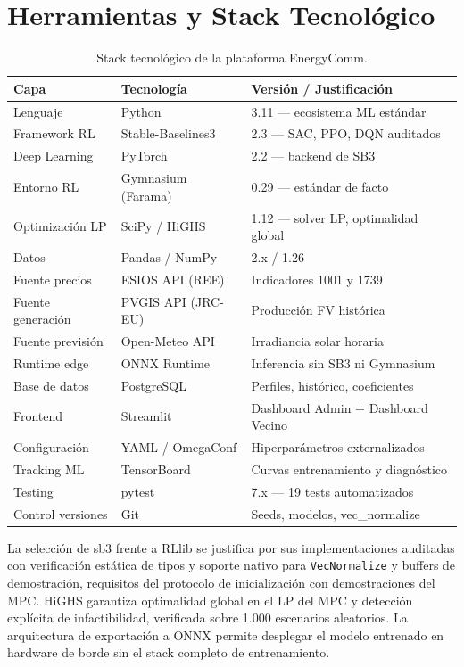 \documentclass[12pt, a4paper, twoside]{report}
\begin{document}
\section{Herramientas y Stack Tecnológico}
\label{sec:herramientas}

\begin{table}[H]
\centering
\caption{Stack tecnológico de la plataforma EnergyComm.}
\label{tab:stack}
\begin{tabularx}{\textwidth}{lll}
\toprule
\textbf{Capa} & \textbf{Tecnología} & \textbf{Versión / Justificación} \\
\midrule
Lenguaje & Python & 3.11 — ecosistema ML estándar \\
Framework RL & Stable-Baselines3 & 2.3 — SAC, PPO, DQN auditados \\
Deep Learning & PyTorch & 2.2 — backend de SB3 \\
Entorno RL & Gymnasium (Farama) & 0.29 — estándar de facto \\
Optimización LP & SciPy / HiGHS & 1.12 — solver LP, optimalidad global \\
Datos & Pandas / NumPy & 2.x / 1.26 \\
Fuente precios & ESIOS API (REE) & Indicadores 1001 y 1739 \\
Fuente generación & PVGIS API (JRC-EU) & Producción FV histórica \\
Fuente previsión & Open-Meteo API & Irradiancia solar horaria \\
Runtime edge & ONNX Runtime & Inferencia sin SB3 ni Gymnasium \\
Base de datos & PostgreSQL & Perfiles, histórico, coeficientes \\
Frontend & Streamlit & Dashboard Admin + Dashboard Vecino \\
Configuración & YAML / OmegaConf & Hiperparámetros externalizados \\
Tracking ML & TensorBoard & Curvas entrenamiento y diagnóstico \\
Testing & pytest & 7.x — 19 tests automatizados \\
Control versiones & Git & Seeds, modelos, vec\_normalize \\
\bottomrule
\end{tabularx}
\end{table}

La selección de \acrshort{sb3} frente a RLlib se justifica por sus
implementaciones auditadas con verificación estática de tipos y soporte nativo
para \texttt{VecNormalize} y buffers de demostración, requisitos del protocolo
de inicialización con demostraciones del MPC. HiGHS garantiza optimalidad global
en el LP del MPC y detección explícita de infactibilidad, verificada sobre 1.000
escenarios aleatorios. La arquitectura de exportación a ONNX permite desplegar
el modelo entrenado en hardware de borde sin el stack completo de entrenamiento.
\end{document}
